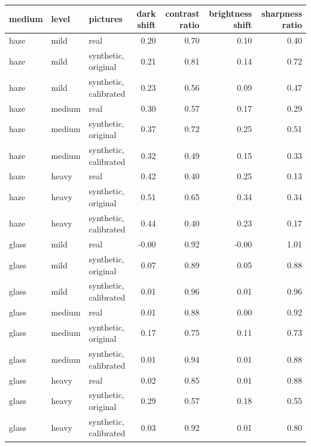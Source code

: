 \begin{tabular}{lllrrrr}
\toprule
medium & level & pictures & dark shift & contrast ratio & brightness shift & sharpness ratio \\
\midrule
haze & mild & real & 0.20 & 0.70 & 0.10 & 0.40 \\
haze & mild & synthetic, original & 0.21 & 0.81 & 0.14 & 0.72 \\
haze & mild & synthetic, calibrated & 0.23 & 0.56 & 0.09 & 0.47 \\
haze & medium & real & 0.30 & 0.57 & 0.17 & 0.29 \\
haze & medium & synthetic, original & 0.37 & 0.72 & 0.25 & 0.51 \\
haze & medium & synthetic, calibrated & 0.32 & 0.49 & 0.15 & 0.33 \\
haze & heavy & real & 0.42 & 0.40 & 0.25 & 0.13 \\
haze & heavy & synthetic, original & 0.51 & 0.65 & 0.34 & 0.34 \\
haze & heavy & synthetic, calibrated & 0.44 & 0.40 & 0.23 & 0.17 \\
glass & mild & real & -0.00 & 0.92 & -0.00 & 1.01 \\
glass & mild & synthetic, original & 0.07 & 0.89 & 0.05 & 0.88 \\
glass & mild & synthetic, calibrated & 0.01 & 0.96 & 0.01 & 0.96 \\
glass & medium & real & 0.01 & 0.88 & 0.00 & 0.92 \\
glass & medium & synthetic, original & 0.17 & 0.75 & 0.11 & 0.73 \\
glass & medium & synthetic, calibrated & 0.01 & 0.94 & 0.01 & 0.88 \\
glass & heavy & real & 0.02 & 0.85 & 0.01 & 0.88 \\
glass & heavy & synthetic, original & 0.29 & 0.57 & 0.18 & 0.55 \\
glass & heavy & synthetic, calibrated & 0.03 & 0.92 & 0.01 & 0.80 \\
\bottomrule
\end{tabular}

